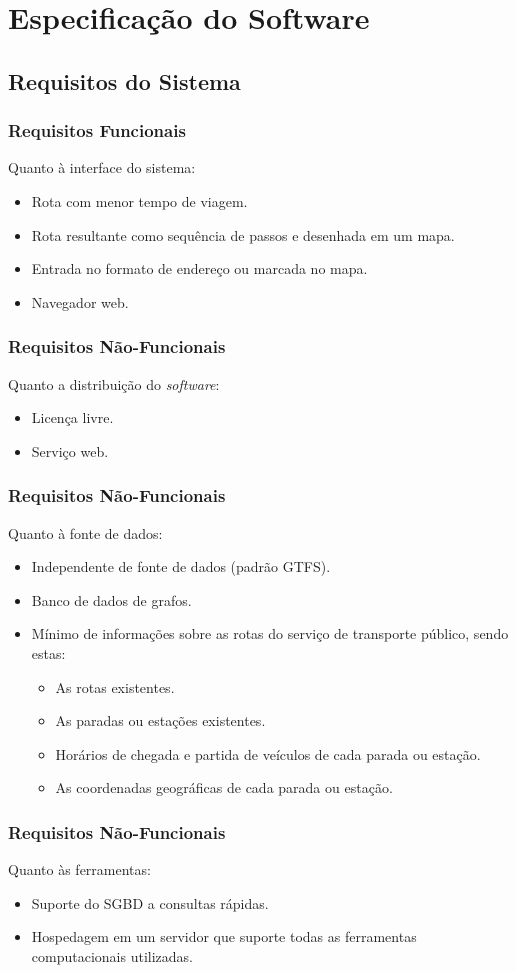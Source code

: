 \section{Especificação do Software}
\subsection{Requisitos do Sistema}

\frame
{
\frametitle{Requisitos Funcionais}
Quanto à interface do sistema:
\begin{itemize}
	\item Rota com menor tempo de viagem.
	\item Rota resultante como sequência de passos e desenhada em um mapa.
	\item Entrada no formato de endereço ou marcada no mapa.
	\item Navegador web.
\end{itemize}
}

\frame
{
\frametitle{Requisitos Não-Funcionais}
Quanto a distribuição do \emph{software}:
\begin{itemize}
	\item Licença livre.
	\item Serviço web.
\end{itemize}
}

\frame
{
\frametitle{Requisitos Não-Funcionais}
Quanto à fonte de dados:
\begin{itemize}
	\item Independente de fonte de dados (padrão GTFS).
	\item Banco de dados de grafos.
	\item Mínimo de informações sobre as rotas do serviço de transporte público, sendo estas:
	\begin{itemize}
		\item As rotas existentes.
		\item As paradas ou estações existentes.
		\item Horários de chegada e partida de veículos de cada parada ou estação.
		\item As coordenadas geográficas de cada parada ou estação.
	\end{itemize}
\end{itemize}
}

\frame
{
\frametitle{Requisitos Não-Funcionais}
Quanto às ferramentas:
\begin{itemize}
	\item Suporte do SGBD a consultas rápidas.
	\item Hospedagem em um servidor que suporte todas as ferramentas computacionais utilizadas.
\end{itemize}
}
